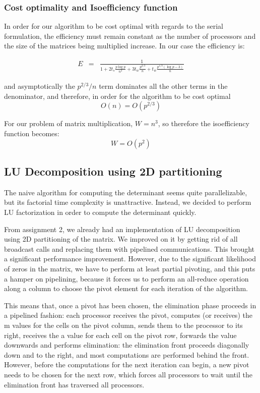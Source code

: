 \documentclass{article}
\begin{document}
\subsubsection{Cost optimality and Isoefficiency function}

In order for our algorithm to be cost optimal with regards to the serial formulation, the efficiency must remain constant as the
number of processors and the size of the matrices being multiplied increase.  In our case the efficiency is:

\begin{eqnarray*}
E &=& \frac{1}{   1 + 2 t_s \frac{ p \log{p} }{ n^3 } + 3 t_w \frac{p^{2/3}}{n} + t_w \frac{p^{1/3} (\log{p} - 3)}{n} }
\end{eqnarray*}

and asymptotically the $p^{2/3}/n$ term dominates all the other terms in the denominator, and therefore, in order for the algorithm to be cost 
optimal $$O(n) = O(p^{2/3})$$

For our problem of matrix multiplication, $W = n^3$, so therefore the isoefficiency function becomes:
$$W = O(p^2)$$

\subsection{LU Decomposition using 2D partitioning}

The naive algorithm for computing the determinant seems quite parallelizable, but its factorial time complexity is unattractive. Instead, we decided to perform LU factorization in order to compute the determinant quickly.

From assignment 2, we already had an implementation of LU decomposition using 2D partitioning of the matrix. We improved on it by getting rid of all broadcast calls and replacing them with pipelined communications. This brought a significant performance improvement. However, due to the significant likelihood of zeros in the matrix, we have to perform at least partial pivoting, and this puts a hamper on pipelining, because it forces us to perform an all-reduce operation along a column to choose the pivot element for each iteration of the algorithm.


This means that, once a pivot has been chosen, the elimination phase proceeds in a pipelined fashion: each processor receives the pivot, computes (or receives) the m values for the cells on the pivot column, sends them to the processor to its right, receives the a value for each cell on the pivot row, forwards the value downwards and performs elimination: the elimination front proceeds diagonally down and to the right, and most computations are performed behind the front.
However, before the computations for the next iteration can begin, a new pivot needs to be chosen for the next row, which forces all processors to wait until the elimination front has traversed all processors.
\end{document}
